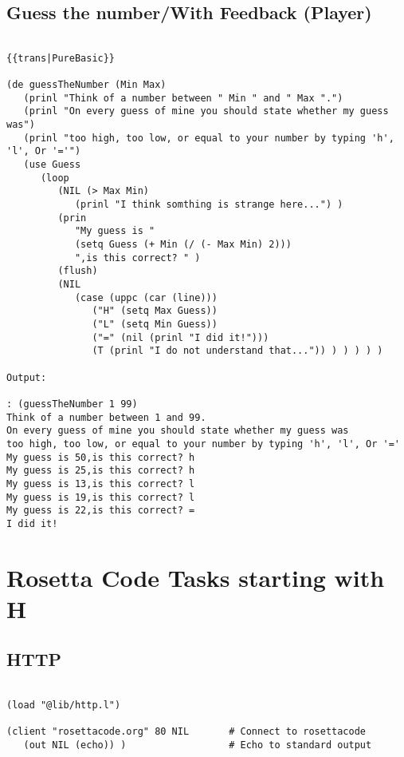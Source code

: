 \section*{Guess the number/With Feedback (Player)}

\begin{verbatim}

{{trans|PureBasic}}

(de guessTheNumber (Min Max)
   (prinl "Think of a number between " Min " and " Max ".")
   (prinl "On every guess of mine you should state whether my guess was")
   (prinl "too high, too low, or equal to your number by typing 'h', 'l', Or '='")
   (use Guess
      (loop
         (NIL (> Max Min)
            (prinl "I think somthing is strange here...") )
         (prin
            "My guess is "
            (setq Guess (+ Min (/ (- Max Min) 2)))
            ",is this correct? " )
         (flush)
         (NIL
            (case (uppc (car (line)))
               ("H" (setq Max Guess))
               ("L" (setq Min Guess))
               ("=" (nil (prinl "I did it!")))
               (T (prinl "I do not understand that...")) ) ) ) ) )

Output:

: (guessTheNumber 1 99)
Think of a number between 1 and 99.
On every guess of mine you should state whether my guess was
too high, too low, or equal to your number by typing 'h', 'l', Or '='
My guess is 50,is this correct? h
My guess is 25,is this correct? h
My guess is 13,is this correct? l
My guess is 19,is this correct? l
My guess is 22,is this correct? =
I did it!

\end{verbatim}

\chapter{Rosetta Code Tasks starting with H}

\section*{HTTP}

\begin{verbatim}

(load "@lib/http.l")

(client "rosettacode.org" 80 NIL       # Connect to rosettacode
   (out NIL (echo)) )                  # Echo to standard output

\end{verbatim}

